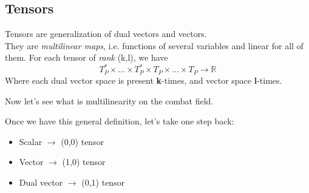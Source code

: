 \subsection{Tensors}

Tensors are generalization of dual vectors and vectors. \\
They are \emph{multilinear maps}, i.e. functions of several variables and linear for all of them. For each tensor of \emph{rank} (k,l), we have
\[
T_{P}^{*}\times \ldots \times T_{P}^{*} \times T_{P}\times \ldots \times T_{P} \to \mathbb{R} \]
Where each dual vector space is present \textbf{k}-times, and vector space \textbf{l}-times.

Now let's see what is multilinearity on the combat field.

\noindent{}

Once we have this general definition, let's take one step back:
\begin{itemize}
	\item Scalar $\to$ (0,0) tensor
	\item Vector $\to$ (1,0) tensor
	\item Dual vector $\to$ (0,1) tensor
\end{itemize}

